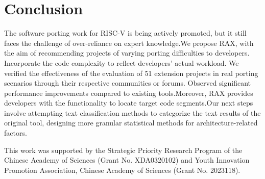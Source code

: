 \documentclass[sigconf,screen,review,anonymous]{acmart}
\begin{document}
\section{Conclusion}
The software porting work for RISC-V is being actively promoted, but it still faces the challenge of over-reliance on expert knowledge.We propose RAX, with the aim of recommending projects of varying porting difficulties to developers. Incorporate the code complexity to reflect developers' actual workload. We verified the effectiveness of the evaluation of 51 extension projects in real porting scenarios through their respective communities or forums. Observed significant performance improvements compared to existing tools.Moreover, RAX provides developers with the functionality to locate target code segments.Our next steps involve attempting text classification methods to categorize the text results of the original tool, designing more granular statistical methods for architecture-related factors.
\begin{acks}
  This work was supported by the Strategic Priority Research Program of the Chinese Academy of Sciences (Grant No. XDA0320102) and Youth Innovation Promotion Association, Chinese Academy of Sciences (Grant No. 2023118).
\end{acks}



\end{document}
